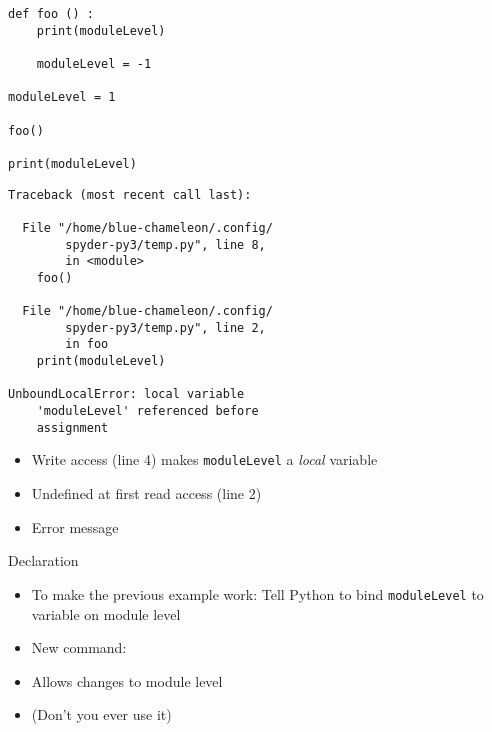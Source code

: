 
\begin{frame}[fragile]
%
\begin{tcbraster}[raster columns=2,
                  raster equal height,
                  nobeforeafter,
                  raster column skip=0.5cm]
\begin{warnbox}[Example: Nonlocal Variables (2), leftupper=7mm]
\begin{verbatim}
def foo () :
    print(moduleLevel)
    
    moduleLevel = -1

moduleLevel = 1

foo()

print(moduleLevel)

\end{verbatim}
\end{warnbox}
%
\begin{cmdbox}
\begin{verbatim}
Traceback (most recent call last):

  File "/home/blue-chameleon/.config/
        spyder-py3/temp.py", line 8, 
        in <module>
    foo()

  File "/home/blue-chameleon/.config/
        spyder-py3/temp.py", line 2,
        in foo
    print(moduleLevel)

UnboundLocalError: local variable 
    'moduleLevel' referenced before
    assignment
\end{verbatim}
\end{cmdbox}
\end{tcbraster}
%
\begin{itemize}
\item Write access (line 4) makes \texttt{moduleLevel} a \emph{local} variable
\item Undefined at first read access (line 2)
\item[\Thus] Error message
\end{itemize}
%
\end{frame}


\begin{frame}[fragile]{ Declaration}
%
\begin{itemize}
\item To make the previous example work: Tell Python to bind \texttt{moduleLevel} to variable on module level
\item New command: 
\item Allows changes to module level
\item (Don't you ever use it)
\end{itemize}
%
\end{frame}

